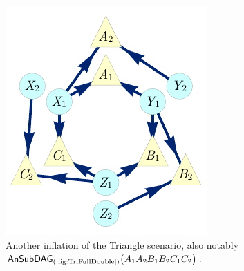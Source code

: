 \begin{figure}[h]
\begin{minipage}[t]{0.3\linewidth}
\centering
\includegraphics[scale=1]{TriDagSub222fixedcoordALT.pdf}
\caption{Another inflation of the Triangle scenario, also notably $\ansubgraph[(\textrm{\cref{fig:TriFullDouble}})]{A_1 A_2 B_1 B_2 C_1 C_2}$.}\label{fig:Tri222}
\end{minipage}
\end{figure}

